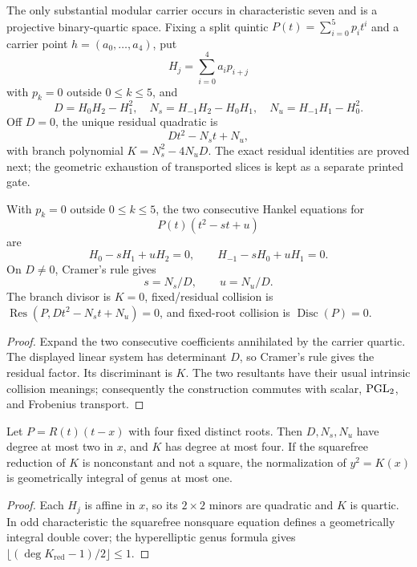 The only substantial modular carrier occurs in characteristic seven
and is a projective binary-quartic space.  Fixing a split quintic
$P(t)=\sum_{i=0}^5p_it^i$ and a carrier point
$h=(a_0,\ldots,a_4)$, put
\[
 H_j=\sum_{i=0}^4a_ip_{i+j}
\]
with $p_k=0$ outside $0\leq k\leq5$, and
\[
 D=H_0H_2-H_1^2,\quad
 N_s=H_{-1}H_2-H_0H_1,\quad
 N_u=H_{-1}H_1-H_0^2.
\]
Off $D=0$, the unique residual quadratic is
\[
       Dt^2-N_st+N_u,
\]
with branch polynomial $K=N_s^2-4N_uD$.  The exact residual identities
are proved next; the geometric exhaustion of transported slices is
kept as a separate printed gate.

\begin{proposition}\label{prop:r9-residual}%
%
With $p_k=0$ outside $0\leq k\leq5$, the two consecutive Hankel
equations for
\[
       P(t)(t^2-st+u)
\]
are
\[
H_0-sH_1+uH_2=0,\qquad
H_{-1}-sH_0+uH_1=0.
\]
On $D\ne0$, Cramer's rule gives
\[
       s=N_s/D,\qquad u=N_u/D.
\]
The branch divisor is $K=0$, fixed/residual collision is
$\operatorname{Res}(P,Dt^2-N_st+N_u)=0$, and fixed-root collision is
$\operatorname{Disc}(P)=0$.
\end{proposition}

\begin{proof}
Expand the two consecutive coefficients annihilated by the carrier
quartic.  The displayed linear system has determinant $D$, so Cramer's
rule gives the residual factor.  Its discriminant is $K$.  The two
resultants have their usual intrinsic collision meanings; consequently
the construction commutes with scalar, $\operatorname{PGL}_2$, and Frobenius
transport.
\end{proof}

\begin{proposition}\label{prop:r9-slice}%
%
Let $P=R(t)(t-x)$ with four fixed distinct roots.  Then
$D,N_s,N_u$ have degree at most two in $x$, and $K$ has degree at most
four.  If the squarefree reduction of $K$ is nonconstant and not a
square, the normalization of $y^2=K(x)$ is geometrically integral of
genus at most one.
\end{proposition}

\begin{proof}
Each $H_j$ is affine in $x$, so its $2\times2$ minors are quadratic and
$K$ is quartic.  In odd characteristic the squarefree nonsquare
equation defines a geometrically integral double cover; the
hyperelliptic genus formula gives
$\lfloor(\deg K_{\mathrm{red}}-1)/2\rfloor\leq1$.
\end{proof}

